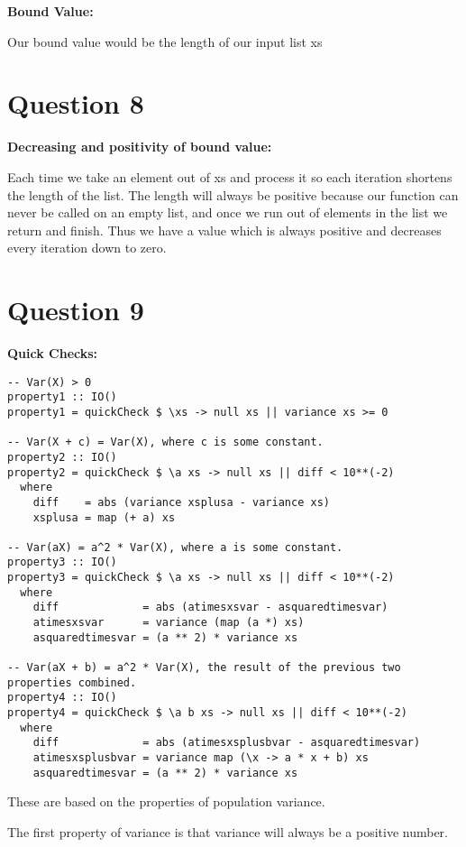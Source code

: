 \documentclass{article}
\begin{document}
\textbf{Bound Value:}

Our bound value would be the length of our input list xs

\section{Question 8}

\textbf{Decreasing and positivity of bound value:}

Each time we take an element out of xs and process it so each iteration shortens the length of the list. The length will always be positive because our function can never be called on an empty list, and once we run out of elements in the list we return and finish. Thus we have a value which is always positive and decreases every iteration down to zero.

\section{Question 9}

\textbf{Quick Checks:}

\begin{verbatim}
-- Var(X) > 0
property1 :: IO()
property1 = quickCheck $ \xs -> null xs || variance xs >= 0

-- Var(X + c) = Var(X), where c is some constant.
property2 :: IO()
property2 = quickCheck $ \a xs -> null xs || diff < 10**(-2)
  where
    diff    = abs (variance xsplusa - variance xs)
    xsplusa = map (+ a) xs

-- Var(aX) = a^2 * Var(X), where a is some constant.
property3 :: IO()
property3 = quickCheck $ \a xs -> null xs || diff < 10**(-2)
  where
    diff             = abs (atimesxsvar - asquaredtimesvar)
    atimesxsvar      = variance (map (a *) xs)
    asquaredtimesvar = (a ** 2) * variance xs

-- Var(aX + b) = a^2 * Var(X), the result of the previous two properties combined.
property4 :: IO()
property4 = quickCheck $ \a b xs -> null xs || diff < 10**(-2)
  where
    diff             = abs (atimesxsplusbvar - asquaredtimesvar)
    atimesxsplusbvar = variance map (\x -> a * x + b) xs
    asquaredtimesvar = (a ** 2) * variance xs
\end{verbatim}

These are based on the properties of population variance.

The first property of variance is that variance will always be a positive number.
\end{document}
